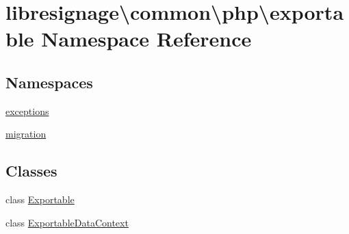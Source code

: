 \hypertarget{namespacelibresignage_1_1common_1_1php_1_1exportable}{}\section{libresignage\textbackslash{}common\textbackslash{}php\textbackslash{}exportable Namespace Reference}
\label{namespacelibresignage_1_1common_1_1php_1_1exportable}
\subsection*{Namespaces}
\begin{DoxyCompactItemize}
\item 
 \hyperlink{namespacelibresignage_1_1common_1_1php_1_1exportable_1_1exceptions}{exceptions}
\item 
 \hyperlink{namespacelibresignage_1_1common_1_1php_1_1exportable_1_1migration}{migration}
\end{DoxyCompactItemize}
\subsection*{Classes}
\begin{DoxyCompactItemize}
\item 
class \hyperlink{classlibresignage_1_1common_1_1php_1_1exportable_1_1Exportable}{Exportable}
\item 
class \hyperlink{classlibresignage_1_1common_1_1php_1_1exportable_1_1ExportableDataContext}{Exportable\+Data\+Context}
\end{DoxyCompactItemize}
